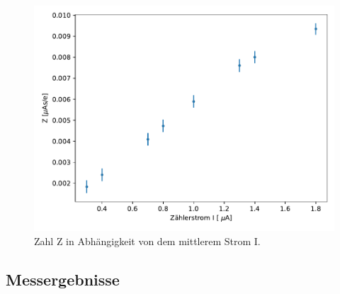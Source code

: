 \begin{figure}
  \label{fig:I_Z}
  \centering
  \includegraphics[width=\textwidth]{Aufgabe_Bestimmung_des_Zaehlrohrstroms.pdf}
  \caption{Zahl Z in Abhängigkeit von dem mittlerem Strom I.}
\end{figure}

\subsection{Messergebnisse}

